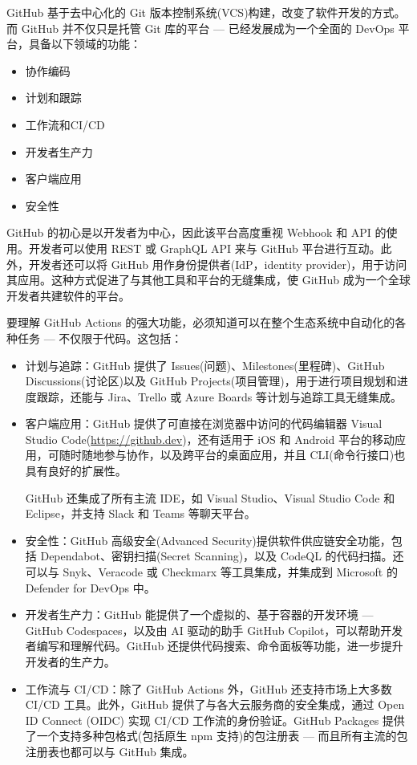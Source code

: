 GitHub 基于去中心化的 Git 版本控制系统(VCS)构建，改变了软件开发的方式。而 GitHub 并不仅只是托管 Git 库的平台 --- 已经发展成为一个全面的 DevOps 平台，具备以下领域的功能：

\begin{itemize}
\item 
协作编码

\item
计划和跟踪

\item
工作流和CI/CD 

\item
开发者生产力

\item
客户端应用

\item
安全性
\end{itemize}

GitHub 的初心是以开发者为中心，因此该平台高度重视 Webhook 和 API 的使用。开发者可以使用 REST 或 GraphQL API 来与 GitHub 平台进行互动。此外，开发者还可以将 GitHub 用作身份提供者(IdP，identity provider)，用于访问其应用。这种方式促进了与其他工具和平台的无缝集成，使 GitHub 成为一个全球开发者共建软件的平台。

要理解 GitHub Actions 的强大功能，必须知道可以在整个生态系统中自动化的各种任务 --- 不仅限于代码。这包括：

\begin{itemize}
\item
计划与追踪：GitHub 提供了 Issues(问题)、Milestones(里程碑)、GitHub Discussions(讨论区)以及 GitHub Projects(项目管理)，用于进行项目规划和进度跟踪，还能与 Jira、Trello 或 Azure Boards 等计划与追踪工具无缝集成。

\item
客户端应用：GitHub 提供了可直接在浏览器中访问的代码编辑器 Visual Studio Code(\url{https://github.dev})，还有适用于 iOS 和 Android 平台的移动应用，可随时随地参与协作，以及跨平台的桌面应用，并且 CLI(命令行接口)也具有良好的扩展性。

GitHub 还集成了所有主流 IDE，如 Visual Studio、Visual Studio Code 和 Eclipse，并支持 Slack 和 Teams 等聊天平台。

\item
安全性：GitHub 高级安全(Advanced Security)提供软件供应链安全功能，包括 Dependabot、密钥扫描(Secret Scanning)，以及 CodeQL 的代码扫描。还可以与 Snyk、Veracode 或 Checkmarx 等工具集成，并集成到 Microsoft 的 Defender for DevOps 中。

\item
开发者生产力：GitHub 能提供了一个虚拟的、基于容器的开发环境 --- GitHub Codespaces，以及由 AI 驱动的助手 GitHub Copilot，可以帮助开发者编写和理解代码。GitHub 还提供代码搜索、命令面板等功能，进一步提升开发者的生产力。

\item
工作流与 CI/CD：除了 GitHub Actions 外，GitHub 还支持市场上大多数 CI/CD 工具。此外，GitHub 提供了与各大云服务商的安全集成，通过 Open ID Connect (OIDC) 实现 CI/CD 工作流的身份验证。GitHub Packages 提供了一个支持多种包格式(包括原生 npm 支持)的包注册表 --- 而且所有主流的包注册表也都可以与 GitHub 集成。
\end{itemize}

